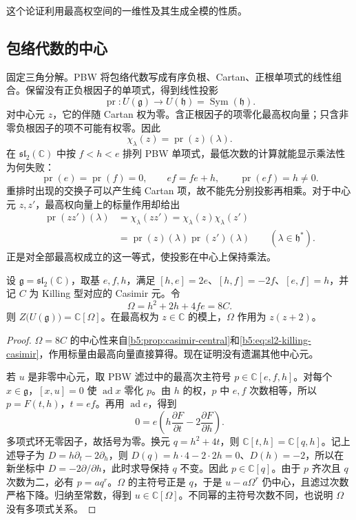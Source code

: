 这个论证利用最高权空间的一维性及其生成全模的性质。

\subsection{包络代数的中心}
\label{b5:subsec:2002:02}

固定三角分解。PBW 将包络代数写成有序负根、Cartan、正根单项式的线性组合。保留没有正负根因子的单项式，得到线性投影
\[
	\operatorname{pr}:U(\mathfrak g)\longrightarrow U(\mathfrak h) =\operatorname{Sym}(\mathfrak h).
\]
对中心元 \(z\)，它的伴随 Cartan 权为零。含正根因子的项零化最高权向量；只含非零负根因子的项不可能有权零。因此
\begin{equation}\label{b5:eq:central-character-projection}
	\chi_\lambda(z)=\operatorname{pr}(z)(\lambda).
\end{equation}
在 \(\mathfrak{sl}_2(\mathbb C)\) 中按 \(f<h<e\) 排列 PBW 单项式，最低次数的计算就能显示乘法性为何失败：
\[
	\operatorname{pr}(e)=\operatorname{pr}(f)=0,\qquad ef=fe+h,\qquad \operatorname{pr}(ef)=h\ne0.
\]
重排时出现的交换子可以产生纯 Cartan 项，故不能先分别投影再相乘。对于中心元 \(z,z'\)，最高权向量上的标量作用却给出
\[
	\begin{aligned}
		\operatorname{pr}(zz')(\lambda) &=\chi_\lambda(zz')=\chi_\lambda(z)\chi_\lambda(z')\\
		&=\operatorname{pr}(z)(\lambda)\operatorname{pr}(z')(\lambda) \qquad(\lambda\in\mathfrak h^*).
	\end{aligned}
\]
正是对全部最高权成立的这一等式，使投影在中心上保持乘法。

\begin{theorem}\label{b5:thm:sl2-enveloping-center}
	设 \(\mathfrak g=\mathfrak{sl}_2(\mathbb C)\)，取基 \(e,f,h\)，满足 \([h,e]=2e\)、\([h,f]=-2f\)、\([e,f]=h\)，并记 \(C\) 为 Killing 型对应的 Casimir 元。令
	\[
		\Omega=h^2+2h+4fe=8C.
	\]
	则 \(Z\bigl(U(\mathfrak g)\bigr)=\mathbb C[\Omega]\)。在最高权为 \(z\in\mathbb C\) 的模上，\(\Omega\) 作用为 \(z(z+2)\)。
\end{theorem}
\begin{proof}
	\(\Omega=8C\) 的中心性来自\cref{b5:prop:casimir-central}和\eqref{b5:eq:sl2-killing-casimir}，作用标量由最高向量直接算得。现在证明没有遗漏其他中心元。

	若 \(u\) 是非零中心元，取 PBW 滤过中的最高次主符号 \(p\in\mathbb C[e,f,h]\)。对每个 \(x\in\mathfrak g\)，\([x,u]=0\) 使 \(\operatorname{ad}x\) 零化 \(p\)。由 \(h\) 的权，\(p\) 中 \(e,f\) 次数相等，所以 \(p=F(t,h)\)，\(t=ef\)。再用 \(\operatorname{ad}e\)，得到
	\[
		0=e\left(h\frac{\partial F}{\partial t}-2\frac{\partial F}{\partial h}\right).
	\]
	多项式环无零因子，故括号为零。换元 \(q=h^2+4t\)，则 \(\mathbb C[t,h]=\mathbb C[q,h]\)。记上述导子为 \(D=h\partial_t-2\partial_h\)，则 \(D(q)=h\cdot4-2\cdot2h=0\)、\(D(h)=-2\)，所以在新坐标中 \(D=-2\partial/\partial h\)，此时求导保持 \(q\) 不变。因此 \(p\in\mathbb C[q]\)。由于 \(p\) 齐次且 \(q\) 次数为二，必有 \(p=a q^r\)。\(\Omega\) 的主符号正是 \(q\)，于是 \(u-a\Omega^r\) 仍中心，且滤过次数严格下降。归纳至常数，得到 \(u\in\mathbb C[\Omega]\)。不同幂的主符号次数不同，也说明 \(\Omega\) 没有多项式关系。
\end{proof}

